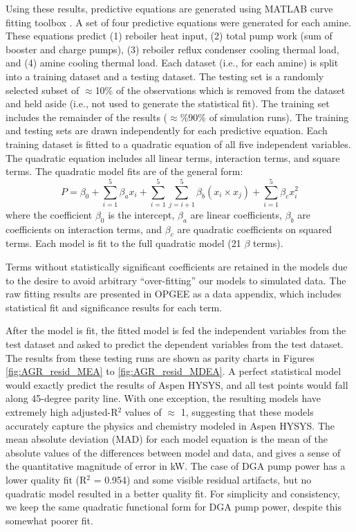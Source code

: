 \documentclass[11pt]{report}
\newcommand{\marg}[1]{{\footnotesize\textit{\textcolor{stanford}{'#1'}}}}
\newcommand{\marginnote}[1]{\marginpar{\marg{#1}}}
\begin{document}
Using these results, predictive equations are generated using MATLAB curve fitting toolbox \cite{Mathworks2016}.  A set of four predictive equations were generated for each amine. These equations predict (1) reboiler heat input, (2) total pump work (sum of booster and charge pumps), (3) reboiler reflux condenser cooling thermal load, and (4) amine cooling thermal load. Each dataset (i.e., for each amine) is split into a training dataset and a testing dataset. The testing set is a randomly selected subset of $\approx$10\% of the observations which is removed from the dataset and held aside (i.e., not used to generate the statistical fit). The training set includes the remainder of the results ($\approx$\%90\% of simulation runs). The training and testing sets are drawn independently for each predictive equation. Each training dataset is fitted to a quadratic equation of all five independent variables. The quadratic equation includes all linear terms, interaction terms, and square terms. The quadratic model fits are of the general form:
\begin{equation} \label{eq:proxymodel}
P 	= \beta_0 + \sum_{i=1}^{5} \beta_a x_i + \sum_{i=1}^{5} \sum_{j=i+1}^{5} \beta_b \left(x_i \times x_j\right) + \sum_{i=1}^{5} \beta_c x_i^2
\end{equation}
where the coefficient $\beta_0$ is the intercept, $\beta_a$ are linear coefficients, $\beta_b$ are coefficients on interaction terms, and $\beta_c$ are quadratic coefficients on squared terms.  Each model is fit to the full quadratic model (21 $\beta$ terms). 

Terms without statistically significant coefficients are retained in the models due to the desire to avoid arbitrary ``over-fitting'' our models to simulated data. The raw fitting results are presented in OPGEE as a data appendix, \marginnote{Acid Gas Removal 4.1} which includes statistical fit and significance results for each term.

After the model is fit, the fitted model is fed the independent variables from the test dataset and asked to predict the dependent variables from the test dataset. The results from these testing runs are shown as parity charts in Figures \ref{fig:AGR_resid_MEA} to \ref{fig:AGR_resid_MDEA}. A perfect statistical model would exactly predict the results of Aspen HYSYS, and all test points would fall along 45-degree parity line. With one exception, the resulting models have extremely high adjusted-R$^2$ values of $\approx$ 1, suggesting that these models accurately capture the physics and chemistry modeled in Aspen HYSYS. The mean absolute deviation (MAD) for each model equation is the mean of the absolute values of the differences between model and data, and gives a sense of the quantitative magnitude of error in kW. The case of DGA pump power has a lower quality fit (R$^2$ = 0.954) and some visible residual artifacts, but no quadratic model resulted in a better quality fit. For simplicity and consistency, we keep the same quadratic functional form for DGA pump power, despite this somewhat poorer fit.
\end{document}

